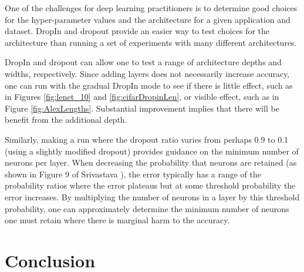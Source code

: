 \documentclass[10pt,twocolumn,letterpaper]{article}
\newcommand{\dropin}{DropIn }
\begin{document}
One of the challenges for deep learning practitioners is to determine good choices for the hyper-parameter values and the architecture for a given application and dataset.
\dropin and dropout provide an easier way to test choices for the architecture than running a set of experiments with many different architectures.

\dropin and dropout can allow one to test a range of architecture depths and widths, respectively.
Since adding layers does not necessarily increase accuracy, one can run with the gradual \dropin mode to see if there is little effect, such as in Figures \ref{fig:lenet_10} and  \ref{fig:cifarDropinLen}, or visible effect, such as in Figure \ref{fig:AlexLengths}.
Substantial improvement implies that there will be benefit from the additional depth.

Similarly, making a run where the dropout ratio varies from perhaps 0.9 to 0.1 (using a slightly modified dropout) provides guidance on the minimum number of neurons per layer.
When decreasing the probability that neurons are retained (as shown in Figure 9 of Srivastava \etal \cite{srivastava2014dropout}), the error typically has a range of the probability ratios where the error plateaus but at some threshold probability the error increases.
By multiplying the number of neurons in a layer by this threshold probability, one can approximately determine the minimum number of neurons one must retain where there is marginal harm to the accuracy.




\section{Conclusion}
\end{document}

